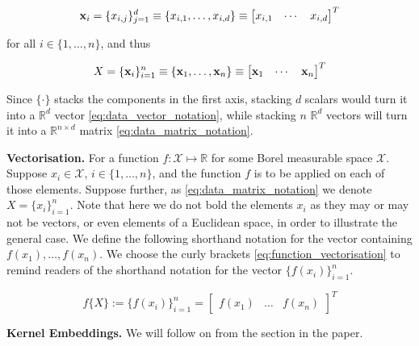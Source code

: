 \documentclass[twoside]{article} \usepackage{aistats2017}
\newcommand{\ds}[1]{{#1}}
\newcommand{\warn}[1]{{\color{red} #1}}
\begin{document}
	\begin{equation}
	\mathbf{x}_{i} = \{x_{i, j}\}_{j = 1}^{d} \equiv \{x_{i, 1}, \dots, x_{i, d}\} \equiv \begin{bmatrix}
	x_{i, 1} & \cdots & x_{i, d}
	\end{bmatrix}^{T}
	\label{eq:data_vector_notation}
	\end{equation}
	
	for all $i \in \{1, \dots, n\}$, and thus

	\begin{equation}
		\ds{X} = \{\bvec{x}_{i}\}_{i = 1}^{n} \equiv \{\bvec{x}_{1}, \dots, \bvec{x}_{n}\} \equiv \begin{bmatrix}
			\bvec{x}_{1} & \cdots & \bvec{x}_{n}
		\end{bmatrix}^{T}
	\label{eq:data_matrix_notation}
	\end{equation}
		
	Since $\{ \cdot \}$ stacks the components in the first axis, stacking $d$ scalars would turn it into a $\mathbb{R}^{d}$ vector \eqref{eq:data_vector_notation}, while stacking $n$ $\mathbb{R}^{d}$ vectors will turn it into a $\mathbb{R}^{n \times d}$ matrix \eqref{eq:data_matrix_notation}.
	
	\textbf{Vectorisation.} For a function $f : \mathcal{X} \mapsto \mathbb{R}$ for some Borel measurable space $\mathcal{X}$. Suppose $x_{i} \in \mathcal{X}$, $i \in \{1, \dots, n\}$, and the function $f$ is to be applied on each of those elements. Suppose further, as \eqref{eq:data_matrix_notation} we denote $X = \{x_{i}\}_{i = 1}^{n}$. Note that here we do not bold the elements $x_{i}$ as they may or may not be vectors, or even elements of a Euclidean space, in order to illustrate the general case. We define the following shorthand notation for the vector containing $f(x_{1}), \dots, f(x_{n})$. We choose the curly brackets \eqref{eq:function_vectorisation} to remind readers of the shorthand notation for the vector $\{f(x_{i})\}_{i = 1}^{n}$.
	
	\begin{equation}
		f\{\ds{X}\} := \{f(x_{i})\}_{i = 1}^{n} = {\begin{bmatrix} f(x_{1}) & \dots & f(x_{n}) \end{bmatrix}}^{T}
	\label{eq:function_vectorisation}
	\end{equation}
	
	\textbf{Kernel Embeddings.} \warn{We will follow on from the section in the paper.}
	
\end{document}
